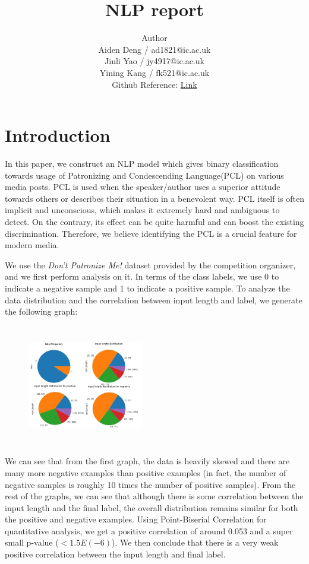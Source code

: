 \documentclass[11pt,a4paper]{article}
\title{ NLP report}
\author{Author \\
  Aiden Deng / ad1821@ic.ac.uk \\
  Jinli Yao / jy4917@ic.ac.uk \\
  Yining Kang / fk521@ic.ac.uk \\
  Github Reference: \href{https://github.com/kangyining/NLP_2022}{Link}  
 \\}
\date{}
\begin{document}
\maketitle
\section{Introduction}
In this paper, we construct an NLP model which gives binary classification towards usage of Patronizing and Condescending Language(PCL) on various media posts. PCL is used when the speaker/author uses a superior attitude towards others or describes their situation in a benevolent way. PCL itself is often implicit and unconscious, which makes it extremely hard and ambiguous to detect. On the contrary, its effect can be quite harmful and can boost the existing discrimination. Therefore, we believe identifying the PCL is a crucial feature for modern media.

We use the \textit{Don't Patronize Me!}\cite{perez-almendros-etal-2020-dont} dataset provided by the competition organizer, and we first perform analysis on it. In terms of the class labels, we use 0 to indicate a negative sample and 1 to indicate a positive sample. To analyze the data distribution and the correlation between input length and label, we generate the following graph:
\begin{figure}[h]
\includegraphics[width=0.45\textwidth, height=150pt]{figures/frequency.jpg}
\end{figure}

We can see that from the first graph, the data is heavily skewed and there are many more negative examples than positive examples (in fact, the number of negative samples is roughly 10 times the number of positive samples). From the rest of the graphs, we can see that although there is some correlation between the input length and the final label, the overall distribution remains similar for both the positive and negative examples. Using Point-Biserial Correlation for quantitative analysis, we get a positive correlation of around 0.053 and a super small p-value ($<1.5E(-6)$). We then conclude that there is a very weak positive correlation between the input length and final label.
\end{document}
